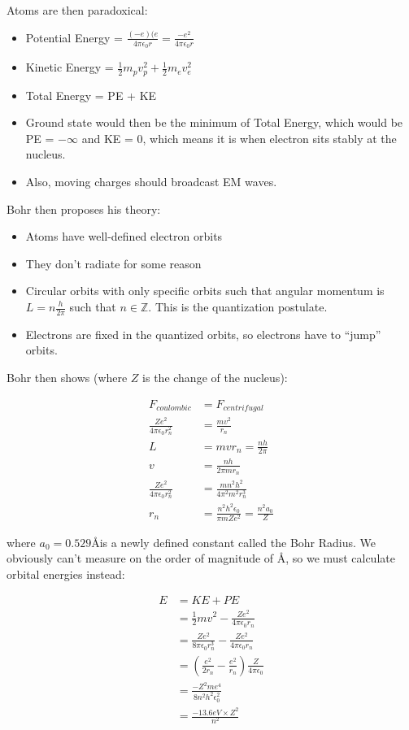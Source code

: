 \documentclass{report}
\begin{document}
Atoms are then paradoxical:

\begin{itemize}
\item Potential Energy = $\frac{(-e)(e}{4 \pi \epsilon_0 r} = \frac{-e^2}{4 \pi \epsilon_0 r}$
\item Kinetic Energy = $\frac{1}{2} m_p v_p^2 + \frac{1}{2}m_e v_e^2$
\item Total Energy = PE + KE
\item Ground state would then be the minimum of Total Energy, which would be PE = $-\infty$ and KE = $0$, which means it is when electron sits stably at the nucleus. 
\item Also, moving charges should broadcast EM waves. 
\end{itemize}

Bohr then proposes his theory:

\begin{itemize}
\item Atoms have well-defined electron orbits
\item They don't radiate for some reason
\item Circular orbits with only specific orbits such that angular momentum is $L = n \frac{h}{2\pi}$ such that $n \in \mathbb{Z}$. This is the quantization postulate.
\item Electrons are fixed in the quantized orbits, so electrons have to "`jump"' orbits. 
\end{itemize}

Bohr then shows (where $Z$ is the change of the nucleus):

\begin{align*}
F_{coulombic} &= F_{centrifugal}\\
\frac{Ze^2}{4\pi \epsilon_0 r_n^2} &= \frac{mv^2}{r_n}\\
L &= mvr_n = \frac{nh}{2\pi}\\
v &= \frac{nh}{2\pi m r_n}\\
\frac{Ze^2}{4\pi \epsilon_0 r_n^2} &= \frac{mn^2h^2}{4\pi^2 m^2 r_n^3}\\
r_n &= \frac{n^2 h^2 \epsilon_0}{\pi m Z e^2} = \frac{n^2 a_0}{Z}
\end{align*}

where $a_0 = 0.529$\AA is a newly defined constant called the Bohr Radius. We obviously can't measure on the order of magnitude of \AA, so we must calculate orbital energies instead:

\begin{align*}
E &= KE + PE\\
&= \frac{1}{2} mv^2 - \frac{Ze^2}{4 \pi \epsilon_0 r_n}\\
&= \frac{Ze^2}{8 \pi \epsilon_0 r_n^3} - \frac{Ze^2}{4 \pi \epsilon_0 r_n}\\
&= (\frac{e^2}{2 r_n} - \frac{e^2}{r_n})\frac{Z}{4\pi \epsilon_0}\\
&= \frac{-Z^2 m e^4}{8 n^2  h^2 \epsilon_0^2}\\
&= \frac{-13.6 eV \times Z^2}{n^2}
\end{align*}
\end{document}
